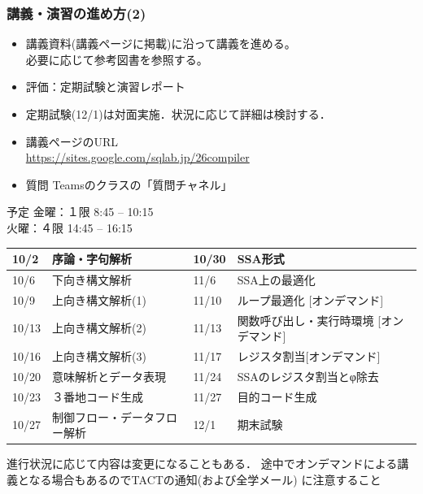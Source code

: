 \documentclass[ckj,dvipdfmx]{beamer}
\begin{document}
\begin{frame}[fragile]
  \frametitle{講義・演習の進め方(2)}
  \begin{itemize}
   \item 講義資料(講義ページに掲載)に沿って講義を進める。\\
	 必要に応じて参考図書を参照する。\\
   \item 評価：定期試験と演習レポート
   \item 定期試験(12/1)は対面実施．状況に応じて詳細は検討する．
   \item 講義ページのURL\\
	 \url{https://sites.google.com/sqlab.jp/26compiler}
   \item 質問 Teamsのクラスの「質問チャネル」\\
  \end{itemize}
\end{frame}

\begin{frame}{予定}
\vfill
金曜：１限 8:45 -- 10:15\\[5pt]
火曜：４限 14:45 -- 16:15
\vfill
\begin{center}
\begin{tabularx}{\textwidth}{|l|X||l|X|}\hline
10/2 & 序論・字句解析 & 10/30 & SSA形式\\\hline
10/6 & 下向き構文解析 & 11/6 & SSA上の最適化 \\\hline
10/9 & 上向き構文解析(1) & 11/10 & ループ最適化 [オンデマンド]\\\hline
10/13 & 上向き構文解析(2) & 11/13 & 関数呼び出し・実行時環境 [オンデマンド]\\\hline
10/16 & 上向き構文解析(3) & 11/17 & レジスタ割当[オンデマンド] \\\hline
10/20 & 意味解析とデータ表現 & 11/24 & SSAのレジスタ割当とφ除去 \\\hline
10/23 & ３番地コード生成 & 11/27 & 目的コード生成 \\\hline
10/27 & 制御フロー・データフロー解析 & 12/1 & 期末試験 \\\hline
\end{tabularx}
\end{center}
\vfill
{\scriptsize\color{red}進行状況に応じて内容は変更になることもある．}
\vfill
{\scriptsize\color{red}途中でオンデマンドによる講義となる場合もあるのでTACTの通知(および全学メール)
に注意すること}
\vfill
\end{frame}
\end{document}
